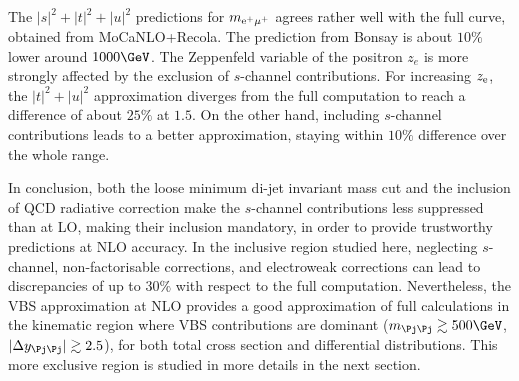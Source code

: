 %
The $|s|^2+|t|^2+|u|^2$ predictions for $m_{\rm e^+\mu^+}$ agrees rather well with the full curve, obtained from {\sc MoCa\-NLO+Recola}.
The prediction from {\sc Bonsay} is about $10\%$ lower around $1000 \GeV$.
The Zeppenfeld variable of the positron $z_e$ is more strongly affected by the exclusion of $s$-channel contributions.
For increasing $z_{\rm e}$, the $|t|^2+|u|^2$ approximation diverges from the full computation to reach a difference of about $25\%$ at $1.5$.
On the other hand, including $s$-channel contributions leads to a better approximation, staying within $10\%$ difference over the whole range.

In conclusion, both the loose minimum di-jet invariant mass cut and the inclusion of QCD radiative correction make the $s$-channel contributions less suppressed than at LO, making their inclusion mandatory, in order to provide trustworthy predictions at NLO accuracy.
In the inclusive region studied here, neglecting $s$-channel, non-factorisable corrections, and electroweak corrections can lead to discrepancies of up to $30\%$ with respect to the full computation.
Nevertheless, the VBS approximation at NLO provides a good approximation of full calculations in the kinematic region where VBS contributions are dominant ($m_{\Pj\Pj} \gtrsim 500 \GeV$, $|\Delta y_{\Pj\Pj}| \gtrsim 2.5$), for both total cross section and differential distributions.
This more exclusive region is studied in more details in the next section.
